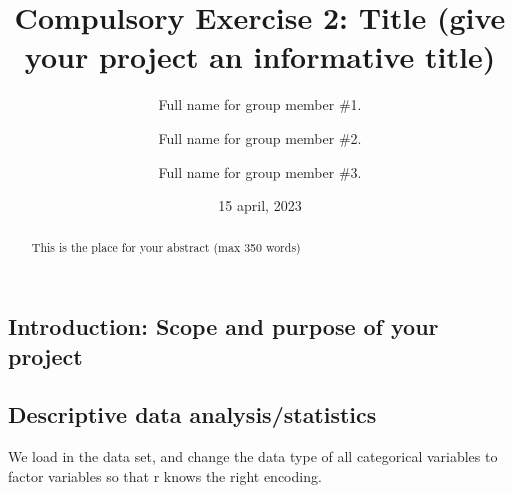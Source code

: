 \documentclass[
]{article}
\title{Compulsory Exercise 2: Title (give your project an informative
title)}
\author{Full name for group member \#1. \and Full name for group member
\#2. \and Full name for group member \#3.}
\date{15 april, 2023}
\newenvironment{Shaded}{\begin{snugshade}}{\end{snugshade}}
\newcommand{\FunctionTok}[1]{\textcolor[rgb]{0.00,0.00,0.00}{#1}}
\newcommand{\NormalTok}[1]{#1}
\newcommand{\OtherTok}[1]{\textcolor[rgb]{0.56,0.35,0.01}{#1}}
\newcommand{\SpecialCharTok}[1]{\textcolor[rgb]{0.00,0.00,0.00}{#1}}
\newcommand{\StringTok}[1]{\textcolor[rgb]{0.31,0.60,0.02}{#1}}
\begin{document}
\maketitle
\begin{abstract}
This is the place for your abstract (max 350 words)
\end{abstract}

\hypertarget{introduction-scope-and-purpose-of-your-project}{%
\subsection{Introduction: Scope and purpose of your
project}\label{introduction-scope-and-purpose-of-your-project}}

\hypertarget{descriptive-data-analysisstatistics}{%
\subsection{Descriptive data
analysis/statistics}\label{descriptive-data-analysisstatistics}}

We load in the data set, and change the data type of all categorical
variables to factor variables so that r knows the right encoding.

\begin{Shaded}
\end{Shaded}
\end{document}
